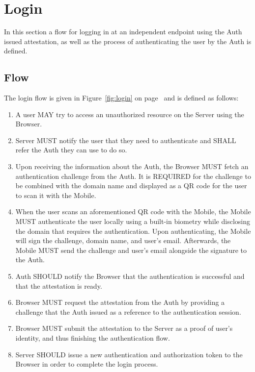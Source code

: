 \section{Login}
In this section a flow for logging in at an independent endpoint using the Auth issued attestation, as well as the 
process of authenticating the user by the Auth is defined. 

    \subsection{Flow}
    The login flow is given in Figure~\ref{fig:login} on page~\pageref{fig:login} and is defined as follows:
        \begin{enumerate}
            \item A user MAY try to access an unauthorized resource on the Server using the Browser.
            \item Server MUST notify the user that they need to authenticate and SHALL refer the Auth they can use 
                  to do so.
            \item Upon receiving the information about the Auth, the Browser MUST fetch an authentication challenge
                  from the Auth. It is REQUIRED for the challenge to be combined with the domain name and
                  displayed as a QR code for the user to scan it with the Mobile.
            \item When the user scans an aforementioned QR code with the Mobile, the Mobile MUST authenticate the 
                  user locally using a built-in biometry while disclosing the domain that requires the authentication.
                  Upon authenticating, the Mobile will sign the challenge, domain name, and user's email. Afterwards, the
                  Mobile MUST send the challenge and user's email alongside the signature to the Auth.
            \item Auth SHOULD notify the Browser that the authentication is successful and that the attestation is
                  ready.
            \item Browser MUST request the attestation from the Auth by providing a challenge that the Auth issued 
                  as a reference to the authentication session.
            \item Browser MUST submit the attestation to the Server as a proof of user's identity, and thus finishing 
                  the authentication flow.
            \item Server SHOULD issue a new authentication and authorization token to the Browser in order to complete
                  the login process.
        \end{enumerate}
        

